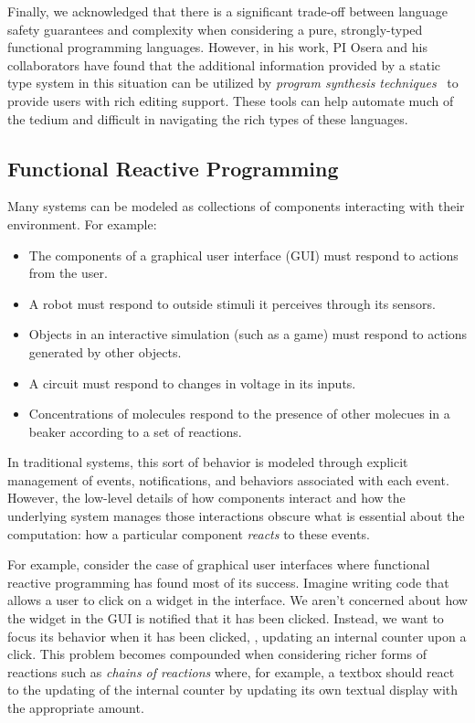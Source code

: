 Finally, we acknowledged that there is a significant trade-off between language safety guarantees and complexity when considering a pure, strongly-typed functional programming languages.
However, in his work, PI Osera and his collaborators have found that the additional information provided by a static type system in this situation can be utilized by \emph{program synthesis techniques}~\cite{osera:thesis:2015} to provide users with rich editing support.
These tools can help automate much of the tedium and difficult in navigating the rich types of these languages.

\subsection{Functional Reactive Programming}

Many systems can be modeled as collections of components interacting with their environment.
For example:
\begin{itemize}[itemsep=0pt]
  \item The components of a graphical user interface (GUI) must respond to actions from the user.
  \item A robot must respond to outside stimuli it perceives through its sensors.
  \item Objects in an interactive simulation (such as a game) must respond to actions generated by other objects.
  \item A circuit must respond to changes in voltage in its inputs.
  \item Concentrations of molecules respond to the presence of other molecues in a beaker according to a set of reactions.
\end{itemize}
In traditional systems, this sort of behavior is modeled through explicit management of events, notifications, and behaviors associated with each event.
However, the low-level details of how components interact and how the underlying system manages those interactions obscure what is essential about the computation: how a particular component \emph{reacts} to these events.

For example, consider the case of graphical user interfaces where functional reactive programming has found most of its success.
Imagine writing code that allows a user to click on a widget in the interface.
We aren't concerned about how the widget in the GUI is notified that it has been clicked.
Instead, we want to focus its behavior when it has been clicked, \eg, updating an internal counter upon a click.
This problem becomes compounded when considering richer forms of reactions such as \emph{chains of reactions} where, for example, a textbox should react to the updating of the internal counter by updating its own textual display with the appropriate amount.

